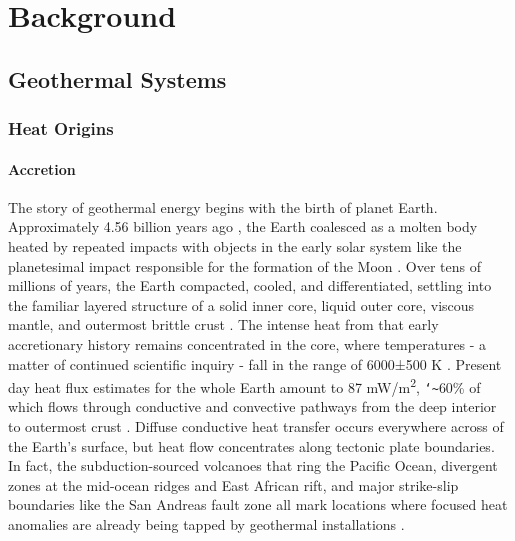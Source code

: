 \chapter{Background}\label{ch2:background}

\section{Geothermal Systems}\label{ch2:geosys}
\subsection{Heat Origins}\label{ch2:heatorig}
\subsubsection{Accretion}\label{ch2:accrete}
The story of geothermal energy begins with the birth of planet Earth. Approximately 4.56 billion years ago \citep{allegre_age_1995, patterson_age_1956}, the Earth coalesced as a molten body heated by repeated impacts with objects in the early solar system like the planetesimal impact responsible for the formation of the Moon \citep{stevenson_origin_2014}. Over tens of millions of years, the Earth compacted, cooled, and differentiated, settling into the familiar layered structure of a solid inner core, liquid outer core, viscous mantle, and outermost brittle crust \citep[~p. 7]{press_understanding_2004}. The intense heat from that early accretionary history remains concentrated in the core, where temperatures - a matter of continued scientific inquiry - fall in the range of 6000±500 K \citep[~p. 372]{fowler_solid_2005}. Present day heat flux estimates for the whole Earth amount to 87 mW/m\textsuperscript{2}, \texttt{\char`\~}60\% of which flows through conductive and convective pathways from the deep interior to outermost crust \citep{stein_heat_1995}. Diffuse conductive heat transfer occurs everywhere across of the Earth’s surface, but heat flow concentrates along tectonic plate boundaries. In fact, the subduction-sourced volcanoes that ring the Pacific Ocean, divergent zones at the mid-ocean ridges and East African rift, and major strike-slip boundaries like the San Andreas fault zone all mark locations where focused heat anomalies are already being tapped by geothermal installations \citep[~p. 16]{dipippo_geothermal_2012}.

